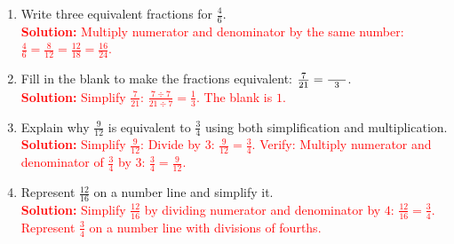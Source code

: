 \documentclass[12pt]{article}
\begin{document}
\begin{tcolorbox}[colframe=black!60, colback=white, 
coltitle=black, colbacktitle=black!15, fonttitle=\bfseries\Large, 
title=Exercises, halign title=center, left=10pt, right=10pt, top=10pt, bottom=60pt]
\begin{enumerate}[itemsep=3em]
    \item Write three equivalent fractions for \( \frac{4}{6} \).\\
    \textcolor{red}{\textbf{Solution:} Multiply numerator and denominator by the same number: \( \frac{4}{6} = \frac{8}{12} = \frac{12}{18} = \frac{16}{24}\).}

    \item Fill in the blank to make the fractions equivalent: \( \frac{7}{21} = \frac{\hspace{5mm}}{3} \).\\
    \textcolor{red}{\textbf{Solution:} Simplify \( \frac{7}{21} \): \( \frac{7 \div 7}{21 \div 7} = \frac{1}{3}\). The blank is \(1\).}

    \item Explain why \( \frac{9}{12} \) is equivalent to \( \frac{3}{4} \) using both simplification and multiplication.\\
    \textcolor{red}{\textbf{Solution:} Simplify \( \frac{9}{12} \): Divide by \(3\): \( \frac{9}{12} = \frac{3}{4}\). Verify: Multiply numerator and denominator of \( \frac{3}{4} \) by \(3\): \( \frac{3}{4} = \frac{9}{12}\).}

    \item Represent \( \frac{12}{16} \) on a number line and simplify it.\\
    \textcolor{red}{\textbf{Solution:} Simplify \( \frac{12}{16} \) by dividing numerator and denominator by \(4\): \( \frac{12}{16} = \frac{3}{4}\). Represent \( \frac{3}{4} \) on a number line with divisions of fourths.}
\end{enumerate}
\end{tcolorbox}

\vspace{1em}
\end{document}
